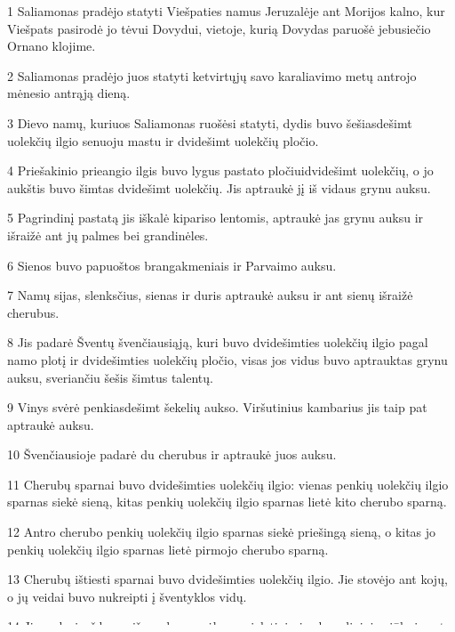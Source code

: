 \par 1 Saliamonas pradėjo statyti Viešpaties namus Jeruzalėje ant Morijos kalno, kur Viešpats pasirodė jo tėvui Dovydui, vietoje, kurią Dovydas paruošė jebusiečio Ornano klojime. 
\par 2 Saliamonas pradėjo juos statyti ketvirtųjų savo karaliavimo metų antrojo mėnesio antrąją dieną. 
\par 3 Dievo namų, kuriuos Saliamonas ruošėsi statyti, dydis buvo šešiasdešimt uolekčių ilgio senuoju mastu ir dvidešimt uolekčių pločio. 
\par 4 Priešakinio prieangio ilgis buvo lygus pastato pločiui­dvidešimt uolekčių, o jo aukštis buvo šimtas dvidešimt uolekčių. Jis aptraukė jį iš vidaus grynu auksu. 
\par 5 Pagrindinį pastatą jis iškalė kipariso lentomis, aptraukė jas grynu auksu ir išraižė ant jų palmes bei grandinėles. 
\par 6 Sienos buvo papuoštos brangakmeniais ir Parvaimo auksu. 
\par 7 Namų sijas, slenksčius, sienas ir duris aptraukė auksu ir ant sienų išraižė cherubus. 
\par 8 Jis padarė Šventų švenčiausiąją, kuri buvo dvidešimties uolekčių ilgio pagal namo plotį ir dvidešimties uolekčių pločio, visas jos vidus buvo aptrauktas grynu auksu, sveriančiu šešis šimtus talentų. 
\par 9 Vinys svėrė penkiasdešimt šekelių aukso. Viršutinius kambarius jis taip pat aptraukė auksu. 
\par 10 Švenčiausioje padarė du cherubus ir aptraukė juos auksu. 
\par 11 Cherubų sparnai buvo dvidešimties uolekčių ilgio: vienas penkių uolekčių ilgio sparnas siekė sieną, kitas penkių uolekčių ilgio sparnas lietė kito cherubo sparną. 
\par 12 Antro cherubo penkių uolekčių ilgio sparnas siekė priešingą sieną, o kitas jo penkių uolekčių ilgio sparnas lietė pirmojo cherubo sparną. 
\par 13 Cherubų ištiesti sparnai buvo dvidešimties uolekčių ilgio. Jie stovėjo ant kojų, o jų veidai buvo nukreipti į šventyklos vidų. 
\par 14 Jis padarė uždangą iš raudonų, mėlynų, violetinių ir plonų lininių siūlų ir ant jos išsiuvinėjo cherubus. 
\par 15 Šventyklos priekyje jis padarė dvi kolonas, kiekvieną trisdešimt penkių uolekčių aukščio, o kapiteliai ant jų viršaus buvo penkių uolekčių. 
\par 16 Jis padarė ir grandinėles kaip Švenčiausioje ir pritvirtino kolonų viršuje. Ant kiekvienos grandinėlės buvo po šimtą granato vaisių. 
\par 17 Kolonos stovėjo šventyklos priekyje, viena­dešinėje, o antra­kairėje; dešiniąją pavadino Jachinu, o kairiąją Boazu.



